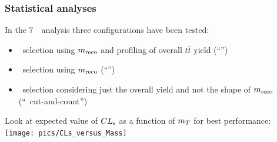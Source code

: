 \begin{frame}\frametitle{Statistical analyses}
\centering\footnotesize

In the 7~\tev\ analysis three configurations have been tested:

\begin{itemize}
\item \loose\ selection using
$m_{\rm reco}$ and profiling of overall $t\bar{t}$ yield (``\loose'')
\item \tight\ selection 
using $m_{\rm reco}$ (``\tight'')
\item \tight\ selection  considering just the overall yield and not 
the shape of $m_{\rm reco}$ (``\tight\ cut-and-count'')
\end{itemize} 

Look at expected value of $CL_{\rm s}$ as a function of $m_{\T}$ for best performance:\\

\texttt{[image: pics/CLs\_versus\_Mass]}


\end{frame}



